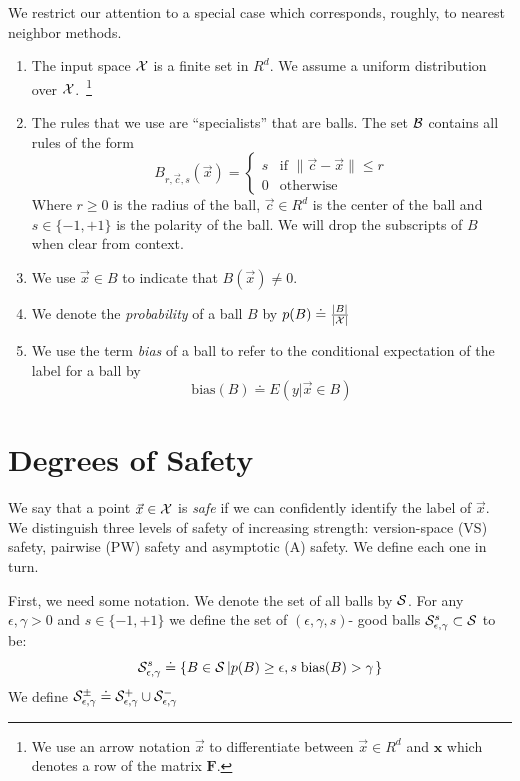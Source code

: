 \documentclass{article}
\newcommand{\X}{{\cal X}}
\newcommand{\B}{{\cal B}}
\newcommand{\x}{\vec{x}}
\newcommand{\cc}{\vec{c}}
\renewcommand{\SS}{{\cal S}} %
\newcommand{\CC}{{\cal C}}  %
\newcommand{\vF}{\mathbf{F}}
\newcommand{\vx}{\mathbf{x}}
\newcommand{\bias}{\text{bias}}
\begin{document}
We restrict our attention to a special case which corresponds,
roughly, to nearest neighbor methods.
\begin{enumerate}
\item The input space $\X$ is a finite set in $R^d$. We assume a
  uniform distribution over $\X$.~\footnote{We use an arrow notation
    $\x$ to differentiate between $\x \in R^d$ and $\vx$ which denotes
    a row of the matrix $\vF$.}
  \item
    The rules that we use are ``specialists'' that are balls. The set
    $\B$ contains all rules of the form
    \[
    B_{r,\cc,s}(\x) =
    \begin{cases}
      s & \text{if } \| \cc- \x \| \leq r \\
    0 & \text{otherwise }
    \end{cases}
    \]
    Where $r \geq 0$ is the radius of the ball, $\cc \in R^d$ is the
    center of the ball and $s \in \{-1,+1\}$ is the polarity of the ball.
    We will drop the subscripts of $B$ when clear from context.
  \item
    We use $\x \in B$ to indicate that $B(\x) \neq 0$.
  \item
    We denote the {\em probability} of a ball $B$ by $p(B) \doteq
    \frac{|B|}{|\X|}$
  \item
    We use the term {\em bias} of a ball to refer to the conditional
    expectation of the label for a ball by
    $$
    \bias(B) \doteq E\left( y|\x \in B \right)
    $$
\end{enumerate}

\newcommand{\edge}{\gamma}
\newcommand{\SepsGamSig}{\SS_{\epsilon,\edge}^{s}}
\newcommand{\SepsGam}{\SS_{\epsilon,\edge}}
\newcommand{\SepsGamMinusSig}{\SS_{\epsilon,\edge}^{-s}}
\newcommand{\ConstrepsGamSig}{\CC_{\epsilon,\edge}^{s}}
\newcommand{\ConstrepsGam}{\CC_{\epsilon,\edge}}
\newcommand{\ConstrepsGamMinusSig}{\CC_{\epsilon,\edge}^{-s}}

\section{Degrees of Safety}
We say that a point $\x \in \X$ is {\em safe} if we can confidently identify
the label of $\x$. We distinguish three levels of safety of
increasing strength: version-space (VS) safety, pairwise (PW) safety and
asymptotic (A) safety. We define each one in turn.

First, we need some notation. We denote the set of all balls by $\SS$. For any $\epsilon,\edge>0$
and $s \in \{-1,+1\}$ we define the set of $(\epsilon,\edge,s)$-
good balls $\SepsGamSig \subset \SS$ to be:
\[
\SepsGamSig \doteq \left\{B \in \SS \left| p(B) \geq \epsilon,
s\; \bias(B) > \edge \right. \right\}
\]
We define $\SepsGam^{\pm} \doteq \SepsGam^{+} \cup \SepsGam^{-}$
\end{document}

